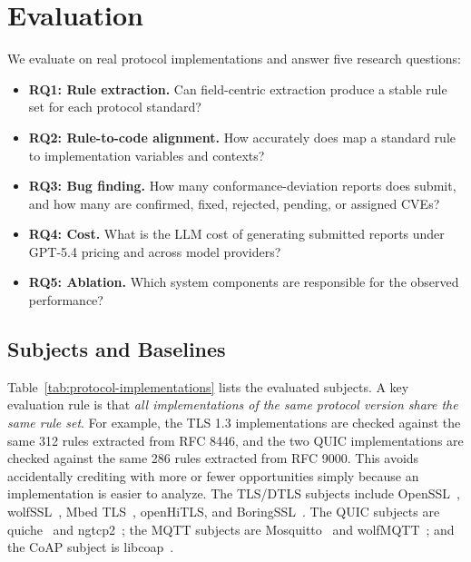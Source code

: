 \section{Evaluation}
\label{sec:evaluation}


We evaluate \tool{} on real protocol implementations and answer five research
questions:
\begin{itemize}[leftmargin=*]
  \item \textbf{RQ1: Rule extraction.} Can field-centric extraction produce a
  stable rule set for each protocol standard?
  \item \textbf{RQ2: Rule-to-code alignment.} How accurately does \tool{} map a
  standard rule to implementation variables and contexts?
  \item \textbf{RQ3: Bug finding.} How many conformance-deviation reports does
  \tool{} submit, and how many are confirmed, fixed, rejected, pending, or
  assigned CVEs?
  \item \textbf{RQ4: Cost.} What is the LLM cost of generating submitted
  reports under GPT-5.4 pricing and across model providers?
  \item \textbf{RQ5: Ablation.} Which system components are responsible for the
  observed performance?
\end{itemize}

\subsection{Subjects and Baselines}

Table~\ref{tab:protocol-implementations} lists the evaluated subjects. A key evaluation rule is
that \emph{all implementations of the same protocol version share the same rule
set}. For example, the TLS 1.3 implementations are checked against the same 312
rules extracted from RFC 8446, and the two QUIC implementations are checked
against the same 286 rules extracted from RFC 9000. This avoids accidentally
crediting \tool{} with more or fewer opportunities simply because an
implementation is easier to analyze.
The TLS/DTLS subjects include OpenSSL~\cite{openssl},
wolfSSL~\cite{wolfssl}, Mbed TLS~\cite{mbedtls}, openHiTLS, and
BoringSSL~\cite{boringssl}. The QUIC subjects are quiche~\cite{quiche} and
ngtcp2~\cite{ngtcp2}; the MQTT subjects are Mosquitto~\cite{mosquitto} and
wolfMQTT~\cite{wolfmqtt}; and the CoAP subject is libcoap~\cite{libcoap}.

